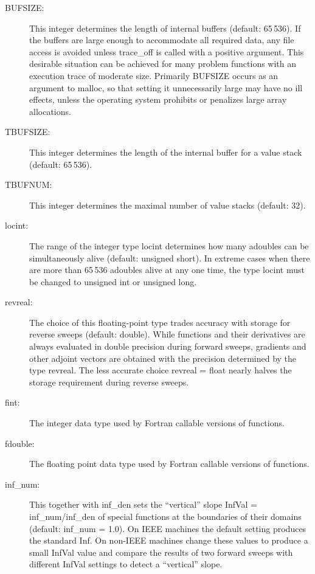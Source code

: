 \documentclass[11pt,twoside]{article}
\begin{document}
\begin{description}
\item[{\sf BUFSIZE}{\rm :}] This integer determines the length of
in\-ter\-nal buf\-fers (default: 65$\,$536). If the buffers are large enough to accommodate all
required data, any file access is avoided unless {\sf trace\_off}
is called with a positive argument. This desirable situation can
be achieved for many problem functions with an execution trace of moderate
size. Primarily {\sf BUFSIZE} occurs as an argument 
to {\sf malloc}, so that setting it unnecessarily large may have no
ill effects, unless the operating system prohibits or penalizes large
array allocations.

\item[{\sf TBUFSIZE}{\rm :}] This integer determines the length of the 
in\-ter\-nal buf\-fer for a value stack (default: 65$\,$536). 

\item[{\sf TBUFNUM}{\rm :}] This integer determines the maximal number of value stacks (default: 32).

\item[{\sf locint}{\rm :}] The range of the integer type 
{\sf locint} determines how many {\sf adouble}s can be simultaneously
alive (default: {\sf unsigned short}).  In extreme cases when there are more than 65$\,$536 {\sf adouble}s
alive at any one time, the type {\sf locint} must be changed to 
{\sf unsigned int} or {\sf unsigned long}.

\item[{\sf revreal}{\rm :}] The choice of this floating-point type
trades accuracy with storage for reverse sweeps (default: {\sf double}). While functions
and their derivatives are always evaluated in double precision 
during forward sweeps, gradients and other adjoint vectors are obtained
with the precision determined by the type {\sf revreal}. The less
accurate choice {\sf revreal} = {\sf float} nearly halves the
storage requirement during reverse sweeps.

\item[{\sf fint}{\rm :}] The integer data type used by Fortran callable versions of functions.

\item[{\sf fdouble}{\rm :}] The floating point data type used by Fortran callable versions of functions.

\item[{\sf inf\_num}{\rm :}] This together with {\sf inf\_den}
sets the ``vertical'' slope {\sf InfVal} = {\sf inf\_num/inf\_den}  
of special functions at the boundaries of their domains (default: {\sf inf\_num} = 1.0). On IEEE machines 
the default setting produces the standard {\sf Inf}. On non-IEEE machines
change these values to produce a small {\sf InfVal} value and compare
the results of two forward sweeps with different {\sf InfVal} settings
to detect a ``vertical'' slope.


\end{description}
\end{document}

